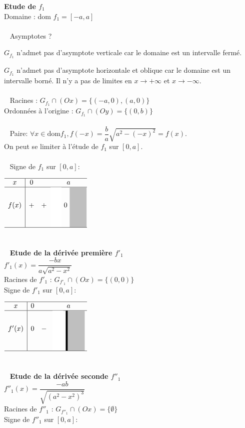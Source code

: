\begin{eleve}
\textbf{Etude de $f_1$}\\
Domaine : dom $f_1 = [-a, a]$\\
\\~
Asymptotes ?

$G_{f_1}$ n'admet pas d'asymptote verticale car le domaine est un intervalle fermé.

$G_{f_1}$ n'admet pas d'asymptote horizontale et oblique car le domaine est un intervalle borné. Il n'y a pas de limites en $x\rightarrow +\infty$ et $x\rightarrow -\infty$.\\
\\~
Racines : $G_{f_1}\cap (Ox) = \{(-a,0), (a,0)\}$\\
Ordonnées à l'origine : $G_{f_1}\cap (Oy) = \{(0,b)\}$\\
\\~
Paire: $\forall x \in \text{dom}f_1, f(-x) = \dfrac{b}{a}\sqrt{a^2 - (-x)^2} = f(x)$.\\
On peut se limiter à l'étude de $f_1$ sur $[0,a]$.\\
\\~
Signe de $f_1$ sur $[0,a]$:

$
\begin{array}{c|c c c}
\hline
x & 0 & & a \\
\hline
f(x) & + & + & 
\makebox[1.5cm]{%
  \raisebox{-0.5\height}{\color{white!50}\rule{0.55cm}{2cm}}
  0
  \raisebox{-0.5\height}{\color{gray!50}\rule{0.85cm}{2cm}}%
}   \\
\hline
\end{array}
$\\
\\~
\\~
\textbf{Etude de la dérivée première $f'_1$}\\
$f'_1(x) = \dfrac{-bx}{a\sqrt{a^2 - x^2}}$\\
Racines de $f'_1$ : $G_{f'_1}\cap (Ox) = \{(0,0)\}$\\
Signe de $f'_1$ sur $[0,a]$:

$
\begin{array}{c|c c c}
\hline
x & 0 & & a \\
\hline
f'(x) & 0 & - & 
\makebox[1.5cm]{%
  \raisebox{-0.5\height}{\color{white!50}\rule{0.55cm}{2cm}}
  \raisebox{-0.5\height}{\rule{3pt}{2cm}}%
  \raisebox{-0.5\height}{\color{gray!50}\rule{0.85cm}{2cm}}%
}   \\
\hline
\end{array}
$\\
\\~
\\~
\textbf{Etude de la dérivée seconde $f''_1$}\\
$f''_1(x) = \dfrac{-ab}{\sqrt{(a^2 - x^2)^3}}$\\
Racines de $f''_1$ : $G_{f''_1}\cap (Ox) = \{\emptyset\}$\\
Signe de $f''_1$ sur $[0,a]$:


\end{eleve}
